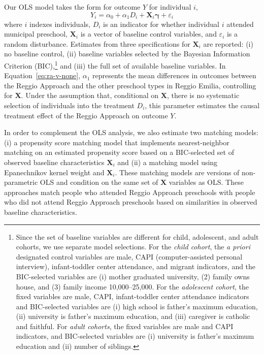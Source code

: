 Our OLS model takes the form for outcome $Y$ for individual $i$,
\begin{equation}\label{eq:ra-v-none}
Y_i = \alpha_0 + \alpha_1 D_i + \bm{X}_i \bm{\gamma} + \varepsilon_i
\end{equation}
where $i$ indexes individuals, $D_i$ is an indicator for whether individual $i$ attended municipal preschool, $\bm{X}_i$ is a vector of baseline control variables, and $\varepsilon_i$ is a random disturbance. Estimates from three specifications for $\bm{X}_i$ are reported: (i) no baseline control, (ii) baseline variables selected by the Bayesian Information Criterion (BIC),\footnote{Since the set of baseline variables are different for child, adolescent, and adult cohorts, we use separate model selections. For the \emph{child cohort}, the \emph{a priori} designated control variables are male, CAPI  (computer-assisted personal interview), infant-toddler center attendance, and migrant indicators, and the BIC-selected variables are (i) mother graduated university, (2) family owns house, and (3) family income 10,000--25,000. For the \emph{adolescent cohort}, the fixed variables are male, CAPI, infant-toddler center attendance indicators and BIC-selected variables are (i) high school is father's maximum education, (ii) university is father's maximum education, and (iii) caregiver is catholic and faithful. For \emph{adult cohorts}, the fixed variables are male and CAPI indicators, and BIC-selected variables are (i) university is father's maximum education and (ii) number of siblings.} and (iii) the full set of available baseline variables. In Equation~\eqref{eq:ra-v-none}, $\alpha_1$ represents the mean differences in outcomes between the Reggio Approach and the other preschool types in Reggio Emilia, controlling for $\bm{X}$. Under the assumption that, conditional on $\bm{X}$, there is no systematic selection of individuals into the treatment $D_i$, this parameter estimates the causal treatment effect of the Reggio Approach on outcome $Y$.

In order to complement the OLS analysis, we also estimate two matching models: (i) a propensity score matching model that implements nearest-neighbor matching on an estimated propensity score based on a BIC-selected set of observed baseline characteristics $\boldsymbol{X}_i$ and (ii) a  matching model using Epanechnikov kernel weight and $\boldsymbol{X}_i$. These matching models are versions of non-parametric OLS and condition on the same set of $\bm{X}$ variables as OLS. These approaches match people who attended Reggio Approach preschools with people who did not attend Reggio Approach preschools based on similarities in observed baseline characteristics.

